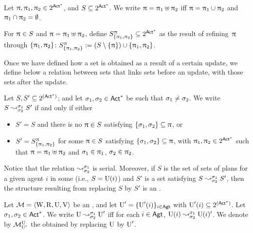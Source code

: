 
\medskip

\begin{definition}
Let $\plans, \plans_1, \plans_2 \in 2^{\ACT^*}$, and $S \subseteq 2^{\ACT^*}$.  We write $\plans = \plans_1\uplus\plans_2$ iff $\plans=\plans_1\cup\plans_2$ and $\plans_1\cap\plans_2=\emptyset$.

For $\plans \in S$ and $\plans=\plans_1\uplus\plans_2$, define  $\lmodel{S}{\plans}{\set{\plans_1,\plans_2}} \subseteq 2^{\ACT^*}$ as the result of refining~$\plans$ through $\set{\plans_1,\plans_2}$: $\lmodel{S}{\plans}{\set{\plans_1,\plans_2}} := (S\setminus\set{\plans})\cup\set{\plans_1,\plans_2}$.
\end{definition}

\medskip

Once we have defined how a set is obtained as a result of a certain update, we define below a relation between sets that links sets before an update, with those sets after the update.

\medskip

\begin{definition}\label{def:splitstr}
Let $S,S' \subseteq 2^{(\ACT^*)}$; and let $\plan_1,\plan_2 \in \ACT^*$ be such that $\plan_1\neq\plan_2$.
We write $\splitstr{S}{S'}{\plan_1}{\plan_2}$ if and only if either
\begin{itemize} \itemsep 0cm
\item $S' = S$ and there is no $\plans\in S$ satisfying $\set{\plan_1, \plan_2} \subseteq \plans$, or
\item $S' = \lmodel{S}{\plans}{\set{\plans_1,\plans_2}}$ for some $\plans \in S$ satisfying $\set{\plan_1, \plan_2} \subseteq \plans$, with $\plans_1, \plans_2 \in 2^{\ACT^*}$ such that
$\plans = \plans_1\uplus\plans_2$ and
$\plan_1 \in \plans_1$, $\plan_2 \in \plans_2$.
\end{itemize}
\end{definition}

\medskip

Notice that the relation $\splitstr{}{}{\plan_1}{\plan_2}$ is serial. Moreover, if $S$ is the set of sets of plans for a given agent $i$ in some \ults (i.e., $S=\Unc(i)$) and $S'$ is a set satisfying $\splitstr{S}{S'}{\plan_1}{\plan_2}$, then the structure resulting from replacing $S$ by $S'$ is an \ults.

\medskip

\begin{definition}
Let $\modults=\tup{\W,\R,\Unc,\V}$ be an \ults, and let $\Unc'=\set{\Unc'(i)}_{i\in\AGT}$ with ${\Unc'(i)\subseteq 2^{(\ACT^*)}}$.
Let $\plan_1,\plan_2 \in \ACT^*$. We write $\splitstr{\Unc}{\Unc'}{\plan_1}{\plan_2}$ iff for each $i\in\AGT$, $\splitstr{\Unc(i)}{\Unc(i)'}{\plan_1}{\plan_2}$.
We denote by $\modults^{\Unc}_{\Unc'}$ the \ults obtained by replacing $\Unc$ by $\Unc'$.
\end{definition}


